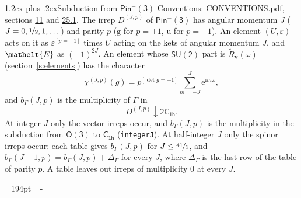 \documentclass[10pt,a4paper]{article}
\makeatletter
\renewcommand\section{\@startsection{section}{1}{\z@}{-3ex plus -1ex minus -.2ex}%
  {1.2ex plus .2ex}{\normalfont\large\sffamily\bfseries\color{parttitle}}}
\newcommand{\needspace}[1]{\par\penalty-100\begingroup\dimen0=#1\relax\dimen2=\pagegoal
  \advance\dimen2-\pagetotal\ifdim\dimen0>\dimen2\relax\ifdim\dimen2>0pt\vfil\break\fi\fi
  \endgroup}
\numberwithin{equation}{section}
\newcommand{\eltfont}[1]{{\let\sigma\eltsigma\mathelt{#1}}}
\newcommand{\grp}[1]{\mathsf{#1}}
\newcommand{\elt}[1]{\eltfont{#1}}
\newcommand{\ptag}[1]{\mathrm{#1}}
\newcommand{\iverson}[1]{[#1]}
\newcommand{\restr}[2]{#1\!\downarrow#2}
\newcommand{\vv}{\mathbf{v}}
\newcommand{\iunit}{\mathrm{i}}
\newcommand{\expe}{\mathrm{e}}
\newcommand{\irrJp}[2]{D^{(#1,#2)}}
\newcommand{\barred}[1]{\bar{#1}}
\newcommand{\lift}[1]{\tilde{#1}}
\makeatother
\begin{document}
\section{Subduction from \texorpdfstring{$\grp{Pin^{-}(3)}$}{Pin(3)}}\label{s:subduction_parent}
Conventions: \href{../../CONVENTIONS.pdf}{CONVENTIONS.pdf}, sections \href{../../../rotation/CONVENTIONS.pdf\#conv.11}{11} and \href{../../CONVENTIONS.pdf\#conv.25.1}{25.1}.
\leavevmode\label{n:index.J}\label{n:index.parity}\label{n:irrep.o3}The irrep $\irrJp{J}{p}$ of \href{Pinminus3.pdf}{$\grp{Pin^{-}(3)}$} has angular momentum $J$ ($J = 0, \nicefrac{1}{2}, 1, \dots$) and parity $p$ ($\ptag{g}$ for $p = +1$, $\ptag{u}$ for $p = -1$). An element $(U, \varepsilon)$ acts on it as $\varepsilon^{[p = -1]}$ times $U$ acting on the kets of angular momentum $J$, and $\elt{\barred{E}}$ as $(-1)^{2J}$. \label{n:function.character.parent}\label{n:function.multiplicity}An element whose $\grp{SU(2)}$ part is $\lift{R}_{\vv}(\omega)$ (section~\ref{s:elements}) has the character
\begin{equation}\label{e:chi}\chi^{(J,p)}(g) = p^{\iverson{\det g = -1}}\sum_{m=-J}^{J} \expe^{\iunit m\omega},\end{equation}
and $b_\Gamma(J, p)$ is the multiplicity of $\Gamma$ in
\begin{equation}\label{e:parent}\restr{\irrJp{J}{p}}{\grp{2C_{1h}}}.\end{equation}
At integer $J$ only the vector irreps occur, and $b_\Gamma(J, p)$ is the multiplicity in the subduction from $\grp{O(3)}$ to \href{../../../rotation/data/pdf/C1h.pdf}{$\grp{C_{1h}}$} (\texttt{integerJ}). \label{n:index.increment}At half-integer $J$ only the spinor irreps occur: each table gives $b_\Gamma(J, p)$ for $J \le \nicefrac{41}{2}$, and $b_\Gamma(J + 1, p) = b_\Gamma(J, p) + \Delta_\Gamma$ for every $J$, where $\Delta_\Gamma$ is the last row of the table of parity $p$. A table leaves out irreps of multiplicity 0 at every $J$.
\needspace{194pt}
\end{document}
